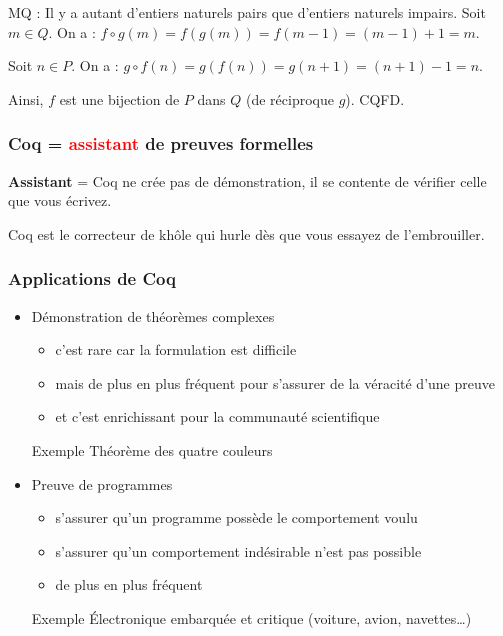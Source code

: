 \documentclass[9pt]{beamer}
\newenvironment{ex}[1][Exemple]{\begin{exampleblock}{#1}}{\end{exampleblock}}
\newcommand{\defi}[1]{\textbf{#1}}
\begin{document}
\begin{frame}[t]
\begin{ex}[MQ : Il y a autant d'entiers naturels pairs que d'entiers naturels impairs.]
\pause
Soit $m \in Q$. On a : $f \circ g (m) = f(g(m)) = f(m - 1) = (m - 1) + 1 = m$.

Soit $n \in P$. On a : $g \circ f (n) = g(f(n)) = g(n + 1) = (n + 1) - 1 = n$.

Ainsi, $f$ est une bijection de $P$ dans $Q$ (de réciproque $g$). CQFD.
\end{ex}
\end{frame}



\begin{frame}
\frametitle{Coq = \textcolor{red}{assistant} de preuves formelles}

\defi{Assistant} = Coq ne crée pas de démonstration, il se contente de vérifier celle que vous écrivez.

\bigskip
Coq est le correcteur de khôle qui hurle dès que vous essayez de l'embrouiller.
\end{frame}



\begin{frame}
\frametitle{Applications de Coq}

\begin{itemize}
 \item Démonstration de théorèmes complexes
\begin{itemize}
  \item c'est rare car la formulation est difficile
  \item mais de plus en plus fréquent pour s'assurer de la véracité d'une preuve
  \item et c'est enrichissant pour la communauté scientifique
\end{itemize}

\begin{ex}
Théorème des quatre couleurs
\end{ex}

\bigskip
\pause
 \item Preuve de programmes
\begin{itemize}
  \item s'assurer qu'un programme possède le comportement voulu
  \item s'assurer qu'un comportement indésirable n'est pas possible
  \item de plus en plus fréquent
\end{itemize}
\begin{ex}
Électronique embarquée et critique (voiture, avion, navettes…)
\end{ex}

\end{itemize}

\end{frame}
\end{document}
